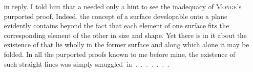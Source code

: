 %
in reply. I told him that a  needed only a hint to see the inadequacy of \textsc{Monge}'s purported proof. Indeed, the concept of a surface developable onto a plane evidently contains  beyond the fact that each element of one surface fits the corresponding element of the other in size and shape. Yet there is  in it about the existence of  that lie wholly in the former surface and along which alone it may be folded. In all the purported proofs known to me before mine, the existence of such straight lines was simply \mbox{smuggled in . . . . . . .}

